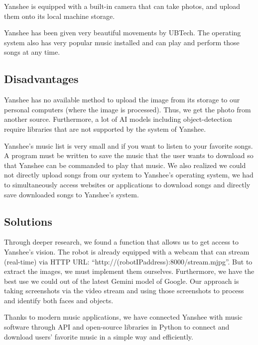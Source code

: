 \documentclass[12pt, a4paper]{article}
\begin{document}
Yanshee is equipped with a built-in camera that can take photos, and upload them onto its local machine storage. 

Yanshee has been given very beautiful movements by  UBTech. The operating system also has very popular music installed and can play and perform those songs at any time.
\subsection{Disadvantages}
Yanshee has no available method to upload the image from its storage to our personal computers (where the image is processed). Thus, we get the photo from another source. Furthermore, a lot of AI models including object-detection require libraries that are not supported by the system of Yanshee.

Yanshee's music list is very small and if you want to listen to your favorite songs. A program must be written to save the music that the user wants to download so that Yanshee can be commanded to play that music. We also realized we could not directly upload songs from our system to Yanshee's operating system, we had to simultaneously access websites or applications to download songs and directly save downloaded songs to Yanshee's system.
\subsection{Solutions}
Through deeper research, we found a function that allows us to get access to Yanshee's vision. The robot is already equipped with a webcam that can stream (real-time) via HTTP URL: “http://(robotIPaddress):8000/stream.mjpg”. But to extract the images, we must implement them ourselves. Furthermore, we have the best use we could out of the latest Gemini model of Google. Our approach is taking screenshots via the video stream and using those screenshots to process and identify both faces and objects. 

Thanks to modern music applications, we have connected Yanshee with music software through API and open-source libraries in Python to connect and download users' favorite music in a simple way and efficiently.
\end{document}
